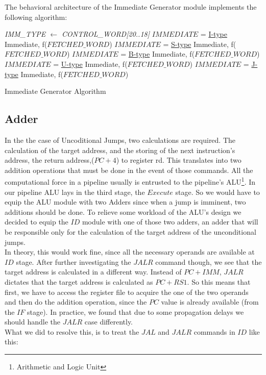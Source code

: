 The behavioral architecture of the Immediate Generator module implements the following algorithm:
	
\begin{algorithm}[H]
	\SetAlgoLined
	
	\BlankLine
	
	\emph{IMM\_TYPE $\leftarrow$ CONTROL\_WORD[20..18]}\;
	 { {\small $IMMEDIATE$ =  \underline{I-type} Immediate, f(\footnotesize{$FETCHED\_WORD$})} \;}
	 { {\small $IMMEDIATE$ =  \underline{S-type} Immediate, f(\footnotesize{$FETCHED\_WORD$})} \;}
	 { {\small $IMMEDIATE$ =  \underline{B-type} Immediate, f(\footnotesize{$FETCHED\_WORD$})} \;}
	 { {\small $IMMEDIATE$ =  \underline{U-type} Immediate, f(\footnotesize{$FETCHED\_WORD$})} \;}
	 { {\small $IMMEDIATE$ =  \underline{J-type} Immediate, f(\footnotesize{$FETCHED\_WORD$})} \;}
	
	\caption{Immediate Generator Algorithm}
\end{algorithm}	
\vspace{5mm}

\subsection{\textcolor{byzantium}{Adder}}
\label{subsection3.4}

In the the case of Uncoditional Jumps, two calculations are required. The calculation of the target address, and the storing of the next instruction's address, the return address,($PC+4$) to register rd. This translates into two addition operations that must be done in the event of those commands. All the computational force in a pipeline usually is entrusted to the pipeline's ALU\footnote{Arithmetic and Logic Unit}. In our pipeline ALU lays in the third stage, the $Execute$ stage. So we would have to equip the ALU module with two Adders since when a jump is imminent, two additions should be done. To relieve some workload of the ALU's design we decided to equip the $ID$ module with one of those two adders, an adder that will be responsible only for the calculation of the target address of the unconditional jumps. \\

In theory, this would work fine, since all the necessary operands are available at $ID$ stage. After further investigating the $JALR$ command though, we see that the target address is calculated in a different way. Instead of $PC+IMM$, $JALR$ dictates that the target address is calculated as $PC+RS1$. So this means that first, we have to access the register file to acquire the one of the two operands and then do the addition operation, since the $PC$ value is already available (from the $IF$ stage). In practice, we found that due to some propagation delays we should handle the $JALR$ case differently. \\ 
\clearpage
What we did to resolve this, is to treat the $JAL$ and $JALR$ commands in $ID$ like this:

